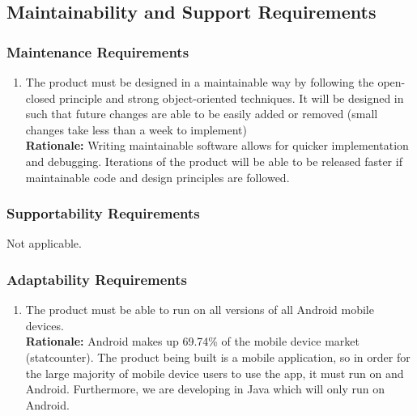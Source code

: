 \documentclass[]{article}
\begin{document}

\subsection{Maintainability and Support Requirements}
\label{sub:maintainability_and_support_requirements}

\subsubsection{Maintenance Requirements}
\label{ssub:maintenance_requirements}
\begin{enumerate}[{MS-M}1. ]
	\item The product must be designed in a maintainable way by following the open-closed principle and strong object-oriented techniques. It will be designed in such that future changes are able to be easily added or removed (small changes take less than a week to implement) \\
	{\bf Rationale:} Writing maintainable software allows for quicker implementation and debugging. Iterations of the product will be able to be released faster if maintainable code and design principles are followed.
\end{enumerate}

\subsubsection{Supportability Requirements}
\label{ssub:supportability_requirements}
Not applicable.

\subsubsection{Adaptability Requirements}
\label{ssub:adaptability_requirements}
\begin{enumerate}[{MS-A}1. ]
	\item The product must be able to run on all versions of all Android mobile devices. \\
	{\bf Rationale:} Android makes up 69.74\% of the mobile device market (statcounter). The product being built is a mobile application, so in order for the large majority of mobile device users to use the app, it must run on and Android. Furthermore, we are developing in Java which will only run on Android.
\end{enumerate}
\end{document}
